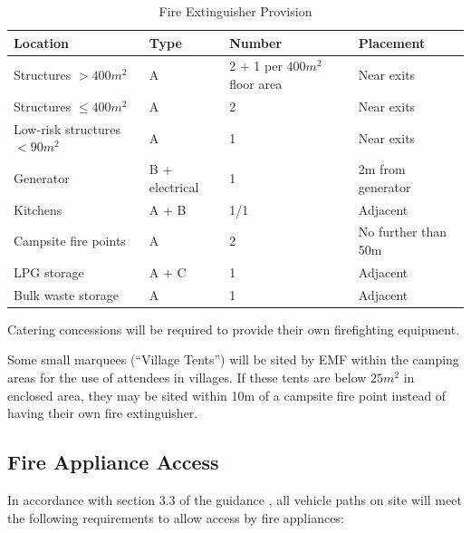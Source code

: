 \begin{table}[h!]
    \caption{Fire Extinguisher Provision}
    \label{table:fireex}
    \centering
    \begin{tabular}{| l | l | l | l |}
        \hline
        \textbf{Location}            & \textbf{Type}  & \textbf{Number}               & \textbf{Placement}  \\
        \hline
        Structures $>400m^2$         & A              & 2 + 1 per $400m^2$ floor area & Near exits          \\
        Structures $\leq400m^2$      & A              & 2                             & Near exits          \\
        Low-risk structures $<90m^2$ & A              & 1                             & Near exits          \\
        Generator                    & B + electrical & 1                             & 2m from generator   \\
        Kitchens                     & A + B          & 1/1                           & Adjacent            \\
        Campsite fire points         & A              & 2                             & No further than 50m \\
        LPG storage                  & A + C          & 1                             & Adjacent            \\
        Bulk waste storage           & A              & 1                             & Adjacent            \\
        \hline
    \end{tabular}
\end{table}

Catering concessions will be required to provide their own firefighting equipment.

Some small marquees (``Village Tents'') will be sited by EMF within the camping areas for the use of
attendees in villages. If these tents are below $25m^2$ in enclosed area, they may be sited within 10m
of a campsite fire point instead of having their own fire extinguisher.

\subsection{Fire Appliance Access}
In accordance with section 3.3 of the guidance \cite{firesafety}, all vehicle paths on site
will meet the following requirements to allow access by fire appliances:


